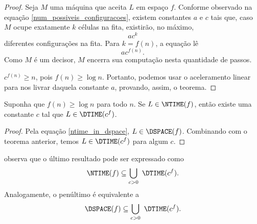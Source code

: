 \begin{proof}
    Seja $M$ uma máquina que aceita $L$ em espaço $f$.
    Conforme observado na equação \ref{num_possiveis_configuracoes},
    existem constantes $a$ e $c$ tais que,
    caso $M$ ocupe exatamente $k$ células na fita,
    existirão, no máximo,
    \begin{equation*}
        ac^k
    \end{equation*}
    diferentes configurações na fita.
    Para $k = f(n)$, a equação lê
    \begin{equation*}
        ac^{f(n)}.
    \end{equation*}
    Como $M$ é um decisor,
    $M$ encerra sua computação nesta quantidade de passos.

    $c^{f(n)} \geq n$, pois $f(n) \geq \log n$.
    Portanto, podemos usar o aceleramento linear
    para nos livrar daquela constante $a$,
    provando, assim, o teorema.
\end{proof}

\begin{theorem}
    Suponha que $f(n) \geq \log n$ para todo $n$.
    Se $L \in \NTIME(f)$,
    então existe uma constante $c$
    tal que $L \in \DTIME(c^f)$.
\end{theorem}

\begin{proof}
    Pela equação \ref{ntime_in_dspace},
    $L \in \DSPACE(f)$.
    Combinando com o teorema anterior,
    temos $L \in \DTIME(c^f)$ para algum $c$.
\end{proof}

 observa que
o último resultado pode ser expressado como
\begin{equation*}
    \NTIME(f) \subseteq \bigcup_{c > 0} \ \DTIME(c^f).
\end{equation*}
Analogamente, o penúltimo é equivalente a
\begin{equation*}
    \DSPACE(f) \subseteq \bigcup_{c > 0} \ \DTIME(c^f).
\end{equation*}
